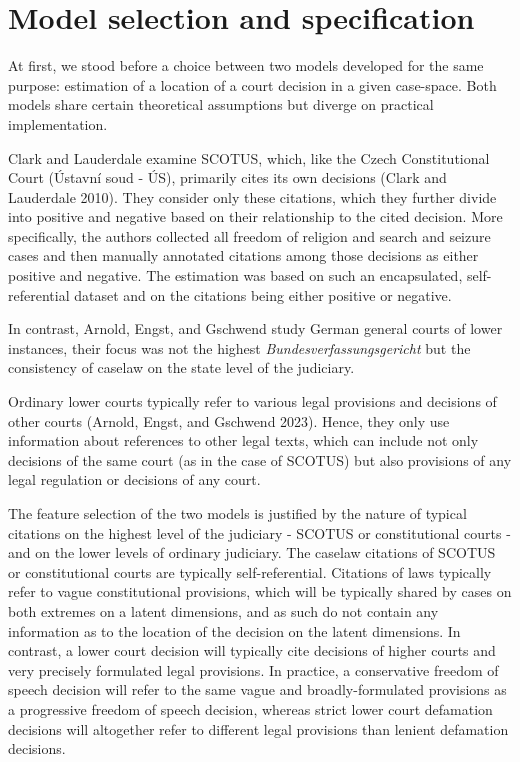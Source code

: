 \documentclass[
  11pt,
]{article}
\begin{document}
\hypertarget{model-selection-and-specification}{%
\section{Model selection and
specification}\label{model-selection-and-specification}}

At first, we stood before a choice between two models developed for the
same purpose: estimation of a location of a court decision in a given
case-space. Both models share certain theoretical assumptions but
diverge on practical implementation.

Clark and Lauderdale examine SCOTUS, which, like the Czech
Constitutional Court (Ústavní soud - ÚS), primarily cites its own
decisions (Clark and Lauderdale 2010). They consider only these
citations, which they further divide into positive and negative based on
their relationship to the cited decision. More specifically, the authors
collected all freedom of religion and search and seizure cases and then
manually annotated citations among those decisions as either positive
and negative. The estimation was based on such an encapsulated,
self-referential dataset and on the citations being either positive or
negative.

In contrast, Arnold, Engst, and Gschwend study German general courts of
lower instances, their focus was not the highest
\emph{Bundesverfassungsgericht} but the consistency of caselaw on the
state level of the judiciary.

Ordinary lower courts typically refer to various legal provisions and
decisions of other courts (Arnold, Engst, and Gschwend 2023). Hence,
they only use information about references to other legal texts, which
can include not only decisions of the same court (as in the case of
SCOTUS) but also provisions of any legal regulation or decisions of any
court.

The feature selection of the two models is justified by the nature of
typical citations on the highest level of the judiciary - SCOTUS or
constitutional courts - and on the lower levels of ordinary judiciary.
The caselaw citations of SCOTUS or constitutional courts are typically
self-referential. Citations of laws typically refer to vague
constitutional provisions, which will be typically shared by cases on
both extremes on a latent dimensions, and as such do not contain any
information as to the location of the decision on the latent dimensions.
In contrast, a lower court decision will typically cite decisions of
higher courts and very precisely formulated legal provisions. In
practice, a conservative freedom of speech decision will refer to the
same vague and broadly-formulated provisions as a progressive freedom of
speech decision, whereas strict lower court defamation decisions will
altogether refer to different legal provisions than lenient defamation
decisions.
\end{document}
